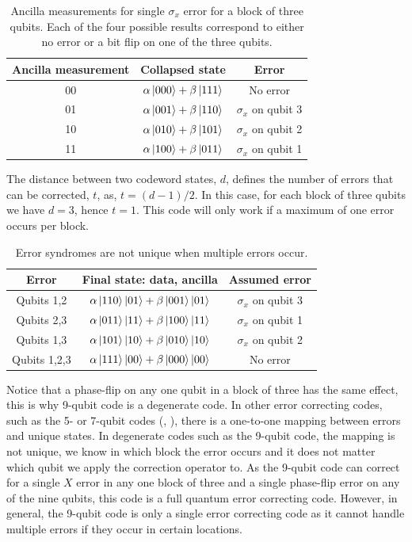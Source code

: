\documentclass[10pt,a4paper]{book}
\numberwithin{equation}{chapter}
\numberwithin{figure}{chapter}
\numberwithin{table}{chapter}
\begin{document}
\begin{table}[H]
    \centering
    \begin{tabular}{|c|c|c|}
    \hline
   Ancilla measurement & Collapsed state & Error \\
    \hline
   00 &$\alpha \ket{000}+\beta \ket{111}$& No error \\
   01 &$\alpha \ket{001}+\beta \ket{110}$& $\sigma_x$ on qubit 3 \\
   10 &$\alpha \ket{010}+\beta \ket{101}$& $\sigma_x$ on qubit 2 \\
   11 &$\alpha \ket{100}+\beta \ket{011}$& $\sigma_x$ on qubit 1 \\
    \hline
    \end{tabular}
	\caption{\footnotesize Ancilla measurements for single $\sigma_x$ error for a block of three qubits. Each of the four possible results correspond to either no error or a bit flip on one of the three qubits.}
	\label{tab:xerror3}
\end{table}
The distance between two codeword states, $d$, defines the number of errors that can be corrected, $t$, as, $t = (d − 1)/2$. In this case, for each block of three qubits we have $d=3$, hence $t=1$. This code will only work if a maximum of one error occurs per block.
\begin{table}[H]
    \centering
    \begin{tabular}{|c|c|c|}
    \hline
   Error & Final state: data, ancilla & Assumed error \\
    \hline
   Qubits 1,2 &$\alpha \ket{110}\ket{01}+\beta \ket{001}\ket{01}$& $\sigma_x$ on qubit 3  \\
   Qubits 2,3 &$\alpha \ket{011}\ket{11}+\beta \ket{100}\ket{11}$& $\sigma_x$ on qubit 1  \\
   Qubits 1,3 &$\alpha \ket{101}\ket{10}+\beta \ket{010}\ket{10}$& $\sigma_x$ on qubit 2 \\
   Qubits 1,2,3 &$\alpha \ket{111}\ket{00}+\beta \ket{000}\ket{00}$& No error  \\
    \hline
    \end{tabular}
	\caption{\footnotesize Error syndromes are not unique when multiple errors occur.}
	\label{tab:errorsyndromes}
\end{table}
Notice that a phase-flip on any one qubit in a block of three has the same effect, this is why 9-qubit code is a degenerate code. In other error correcting codes, such as the 5- or 7-qubit codes (\cite{5qec}, \cite{7qec}), there is a one-to-one mapping between errors and unique states. In degenerate codes such as the 9-qubit code, the mapping is not unique, we know in which block the error occurs and it does not matter which qubit we apply the correction operator to. As the 9-qubit code can correct for a single $X$ error in any one block of three and a single phase-flip error on any of the nine qubits, this code is a full quantum error correcting code. However, in general, the 9-qubit code is only a single error correcting code as
it cannot handle multiple errors if they occur in certain locations.
\end{document}
